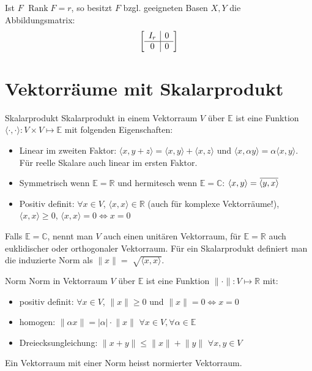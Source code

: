 \documentclass[a4paper,10pt]{article}
\DeclareMathOperator{\Rank}{Rank}
\newcommand{\overbar}[1]{\mkern 1.5mu\overline{\mkern-1.5mu#1\mkern-1.5mu}\mkern 1.5mu}
\begin{document}
Ist $F$ $\Rank F = r$, so besitzt $F$ bzgl. geeigneten Basen $X, Y$ die Abbildungsmatrix: 
\[
  \left[\begin{array}{ c | c }
    I_r & 0 \\
    \hline
    0 & 0
  \end{array}\right]
\]

\section{Vektorräume mit Skalarprodukt}

\begin{subbox}{Skalarprodukt}
  Skalarprodukt in einem Vektorraum $V$ über $\mathbb{E}$ ist eine Funktion $\langle \cdot, \cdot \rangle : V \times V \mapsto \mathbb{E}$ mit folgenden Eigenschaften:
  \begin{itemize}
    \item Linear im zweiten Faktor: $\langle x, y + z \rangle = \langle x, y \rangle + \langle x, z \rangle$ und $\langle x, \alpha y \rangle = \alpha \langle x, y \rangle$. Für reelle Skalare auch linear im ersten Faktor.
    \item  Symmetrisch wenn $\mathbb{E} = \mathbb{R}$ und hermitesch wenn $\mathbb{E} = \mathbb{C}$: $\langle x, y \rangle = \overbar{\langle y, x \rangle}$
    \item Positiv definit: $\forall x \in V$, $\langle x, x \rangle \in \mathbb{R}$ (auch für komplexe Vektorräume!), $\langle x, x \rangle \geq 0$, $\langle x, x \rangle = 0 \iff x = 0$
  \end{itemize}
  Falls $\mathbb{E} = \mathbb{C}$, nennt man $V$ auch einen unitären Vektorraum, für $\mathbb{E} = \mathbb{R}$ auch euklidischer oder orthogonaler Vektorraum. Für ein Skalarprodukt definiert man die induzierte Norm als $\lVert x \rVert = \sqrt[]{\langle x, x \rangle}$.
\end{subbox}

\begin{subbox}{Norm}
  Norm in Vektorraum $V$ über $\mathbb{E}$ ist eine Funktion $\lVert \cdot \rVert: V \mapsto \mathbb{R}$ mit:
  \begin{itemize}
    \item positiv definit: $\forall x \in V$, $\lVert x \rVert \geq 0$ und $\lVert x \rVert = 0 \iff x = 0$
    \item homogen: $\lVert \alpha x \rVert = \lvert \alpha \rvert \cdot \lVert x \rVert$ $\forall x \in V, \forall \alpha \in \mathbb{E}$
    \item Dreiecksungleichung: $\lVert x + y \rVert \leq \lVert x \rVert + \lVert y \rVert$ $\forall x, y \in V$
  \end{itemize}
  Ein Vektorraum mit einer Norm heisst normierter Vektorraum.
\end{subbox}
\end{document}
